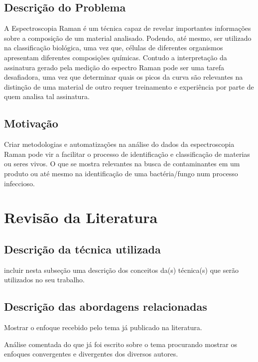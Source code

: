 \documentclass{article}
\begin{document}
\vspace{2cm}
\subsection{Descrição do Problema}
\vspace{1cm} A Espectroscopia Raman é um técnica capaz de revelar importantes informações sobre a composição de um material analisado. Podendo, até mesmo, ser utilizado na classificação biológica, uma vez que, células de diferentes organismos apresentam diferentes composições químicas.
Contudo a interpretação da assinatura gerado pela medição do espectro Raman pode ser uma tarefa desafiadora, uma vez que determinar quais os picos da curva são relevantes na distinção de uma material de outro requer treinamento e experiência por parte de quem analisa tal assinatura.

\subsection{Motivação}
\vspace{1cm} Criar metodologias e automatizações na análise do dados da espectroscopia Raman pode vir a facilitar o processo de identificação e classificação de materias ou seres vivos. O que se mostra relevantes na busca de contaminantes em um produto ou até mesmo na identificação de uma bactéria/fungo num processo infeccioso.

\vspace{2cm}
\section{Revisão da Literatura}
\subsection{Descrição da técnica utilizada}
incluir nesta subseção uma descrição dos conceitos da(s) técnica(s)
que serão utilizados no seu trabalho.

\subsection{Descrição das abordagens relacionadas}
\vspace{1cm} Mostrar o enfoque recebido pelo tema já publicado na
literatura. \vspace{1cm}

Análise comentada do que já foi escrito sobre o tema procurando
mostrar os enfoques convergentes e divergentes dos diversos
autores. \vspace{1cm}
\end{document}
